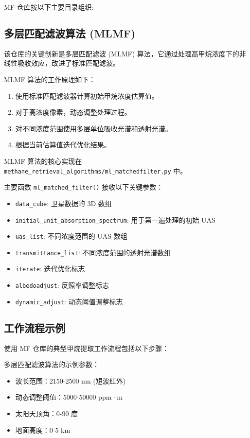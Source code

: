 MF 仓库按以下主要目录组织:

\subsection{多层匹配滤波算法
(MLMF)}\label{ux591aux5c42ux5339ux914dux6ee4ux6ce2ux7b97ux6cd5-mlmf}

该仓库的关键创新是多层匹配滤波 (MLMF)
算法，它通过处理高甲烷浓度下的非线性吸收效应，改进了标准匹配滤波。

MLMF 算法的工作原理如下：

\begin{enumerate}
\def\labelenumi{\arabic{enumi}.}
\tightlist
\item
  使用标准匹配滤波器计算初始甲烷浓度估算值。
\item
  对于高浓度像素，动态调整处理过程。
\item
  对不同浓度范围使用多层单位吸收光谱和透射光谱。
\item
  根据当前估算值迭代优化结果。
\end{enumerate}

MLMF 算法的核心实现在
\texttt{methane\_retrieval\_algorithms/ml\_matchedfilter.py} 中。

主要函数 \texttt{ml\_matched\_filter()} 接收以下关键参数：

\begin{itemize}
\tightlist
\item
  \texttt{data\_cube}: 卫星数据的 3D 数组
\item
  \texttt{initial\_unit\_absorption\_spectrum}: 用于第一遍处理的初始 UAS
\item
  \texttt{uas\_list}: 不同浓度范围的 UAS 数组
\item
  \texttt{transmittance\_list}: 不同浓度范围的透射光谱数组
\item
  \texttt{iterate}: 迭代优化标志
\item
  \texttt{albedoadjust}: 反照率调整标志
\item
  \texttt{dynamic\_adjust}: 动态阈值调整标志
\end{itemize}

\subsection{工作流程示例}\label{ux5de5ux4f5cux6d41ux7a0bux793aux4f8b}

使用 MF 仓库的典型甲烷提取工作流程包括以下步骤：

多层匹配滤波算法的示例参数：

\begin{itemize}
\tightlist
\item
  波长范围：2150-2500 nm (短波红外)
\item
  动态调整阈值：5000-50000 ppm·m
\item
  太阳天顶角：0-90 度
\item
  地面高度：0-5 km
\end{itemize}
